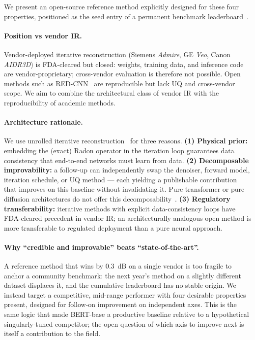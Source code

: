 \documentclass{article}  %
\begin{document}
We present an open-source reference method explicitly designed for these four properties, positioned as the seed entry of a permanent benchmark leaderboard~\citep{ws4leaderboard}.

\paragraph{Position vs vendor IR.} Vendor-deployed iterative reconstruction (Siemens \textit{Admire}, GE \textit{Veo}, Canon \textit{AIDR3D}) is FDA-cleared but closed: weights, training data, and inference code are vendor-proprietary; cross-vendor evaluation is therefore not possible. Open methods such as RED-CNN~\citep{chen2017redcnn} are reproducible but lack UQ and cross-vendor scope. We aim to combine the architectural class of vendor IR with the reproducibility of academic methods.

\paragraph{Architecture rationale.} We use unrolled iterative reconstruction~\citep{adler2018learned,mardani2018neural} for three reasons. \textbf{(1) Physical prior:} embedding the (exact) Radon operator in the iteration loop guarantees data consistency that end-to-end networks must learn from data. \textbf{(2) Decomposable improvability:} a follow-up can independently swap the denoiser, forward model, iteration schedule, or UQ method --- each yielding a publishable contribution that improves on this baseline without invalidating it. Pure transformer or pure diffusion architectures do not offer this decomposability~\citep{liu2024diffusion}. \textbf{(3) Regulatory transferability:} iterative methods with explicit data-consistency loops have FDA-cleared precedent in vendor IR; an architecturally analogous open method is more transferable to regulated deployment than a pure neural approach.

\paragraph{Why ``credible and improvable'' beats ``state-of-the-art''.} A reference method that wins by 0.3~dB on a single vendor is too fragile to anchor a community benchmark: the next year's method on a slightly different dataset displaces it, and the cumulative leaderboard has no stable origin. We instead target a competitive, mid-range performer with four desirable properties present, designed for follow-on improvement on independent axes. This is the same logic that made BERT-base a productive baseline relative to a hypothetical singularly-tuned competitor; the open question of which axis to improve next is itself a contribution to the field.
\end{document}
